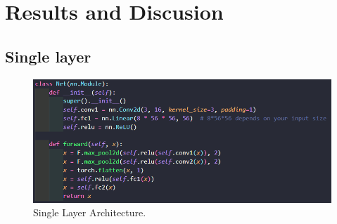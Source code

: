 \documentclass[conference]{IEEEtran}
\begin{document}
\section{Results and Discusion}

\subsection{Single layer}

\begin{figure}[h]
    \centering
    \includegraphics[width=\linewidth]{single layer arc.png}
    \caption{Single Layer Architecture.}
    \label{figSl}
\end{figure}
\end{document}
